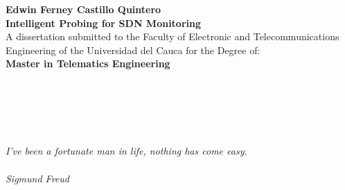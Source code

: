 \newpage{\pagestyle{empty}\cleardoublepage}

\newpage
\begin{center}
\Large\textbf{Edwin Ferney Castillo Quintero} ~\\[5.0cm]
\thispagestyle{empty} \vspace*{0cm} \textbf{\huge
    \Large Intelligent Probing for SDN Monitoring} ~\\[3.0cm]

    \normalsize {A dissertation submitted to the Faculty of Electronic and Telecommunications Engineering of the Universidad del Cauca for the Degree of:} ~\\[1.5cm]
    \normalsize \textbf{Master in Telematics Engineering} ~\\[3.0cm]
    \normalsize {}\selectfont {Advisor: ~\\ Oscar Mauricio Caicedo Rendon ~\\ Ph.D. in Computer Science} ~\\[3.0cm]
    \normalsize {}\selectfont {Popay\'an, \monthyeardate\today \par}
\end{center}

\newpage{\pagestyle{empty}\cleardoublepage}

\newpage
\thispagestyle{empty} \textbf{}\normalsize
\\\\\\%

\begin{flushright}
\begin{minipage}{8cm}
    \noindent
        \small
        \textit{I've been a fortunate man in life, nothing has come easy.\\\\
        Sigmund Freud\\
        }
\end{minipage}
\end{flushright}

\newpage{\pagestyle{empty}\cleardoublepage}
\newpage
\thispagestyle{empty} \textbf{}\normalsize
\\\\\\%


\newpage{\pagestyle{empty}\cleardoublepage}
\newpage
\thispagestyle{empty} \textbf{}\normalsize
\\\\\\%

\newpage

\thispagestyle{empty} \textbf{}\normalsize